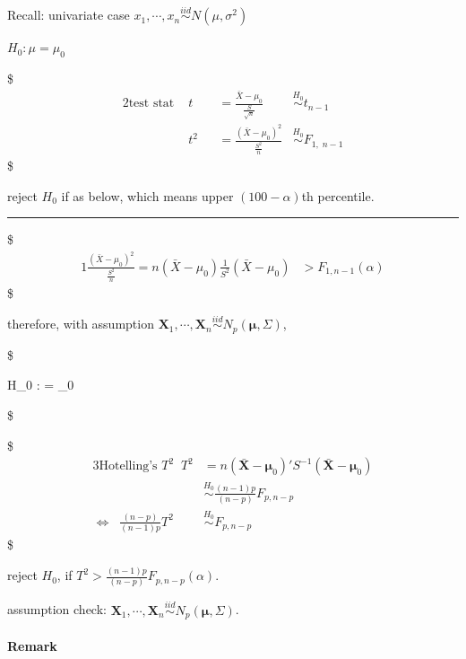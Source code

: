 \documentclass[
]{book}
\begin{document}
{{{Recall:
univariate case \(x_1 , \cdots, x_n \overset {iid} {\sim} N(\mu, \sigma^2)\)

\(H_0 : \mu = \mu_0\)

\$
\begin{alignat*}{2}

\text{test stat } &t &&=\tfrac{\bar X - \mu_0}{\tfrac{S}{\sqrt{n}}} &\overset{H_0}{\sim} t_{n-1} \\


&t^2 &&=\tfrac{(\bar X - \mu_0)^2}{\tfrac{S^2}{n}} &\overset{H_0}{\sim} F_{1, \; n-1}

\end{alignat*}
\$

reject \(H_0\) if as below, which means upper \((100-\alpha)\)th percentile.

\begin{center}\rule{0.5\linewidth}{0.5pt}\end{center}

\$
\begin{alignat*}{1}
\tfrac{(\bar X - \mu_0)^2}{\tfrac{S^2}{n}} = n(\bar X - \mu_0)\tfrac{1}{S^2}(\bar X - \mu_0) &> F_{1,n-1}(\alpha)
\end{alignat*}
\$

therefore, with assumption \(\pmb X_1 , \cdots, \pmb X_n \overset {iid} {\sim} N_p (\pmb \mu , \Sigma)\),

\$

H\_0 : \pmb \mu = \pmb \mu\_0

\$

\$
\begin{alignat*}{3}

\text{Hotelling's }T^2 \; \; T^2 &= n(\bar {\pmb X} - \pmb \mu_0)' S^{-1} (\bar {\pmb X} - \pmb \mu_0) \\

&\overset{H_0}{\sim} \tfrac{(n-1)p}{(n-p)} F_{p,n-p} \\

\iff \; \; \tfrac {(n-p)} {(n-1)p} T^2 &\overset{H_0}{\sim} F_{p,n-p}
\end{alignat*}
\$

reject \(H_0\), if \(T^2 > \tfrac{(n-1)p}{(n-p)} F_{p,n-p} (\alpha)\).

assumption check: \(\pmb X_1 , \cdots, \pmb X_n \overset{iid}{\sim} N_p (\pmb \mu , \Sigma)\).

\hypertarget{remark}{%
\paragraph{Remark}\label{remark}}

}}}
\end{document}
